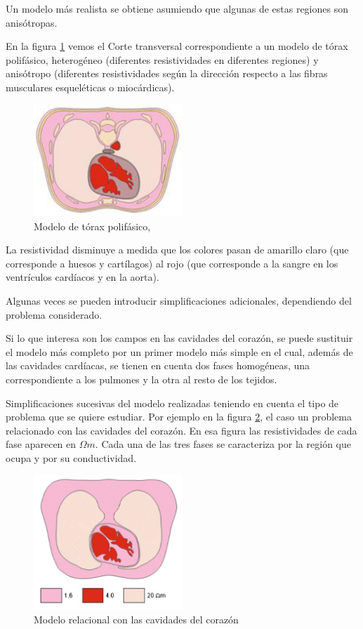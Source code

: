 Un modelo más realista se obtiene asumiendo que algunas de estas regiones son anisótropas.


En la figura \ref{fig:60} vemos el Corte transversal correspondiente a un modelo de tórax polifásico, heterogéneo (diferentes resistividades en diferentes regiones) y anisótropo (diferentes resistividades según la dirección respecto a las fibras musculares esqueléticas o miocárdicas).

\begin{figure}[H]
    \centering
    \includegraphics[width=0.5\textwidth]{./Figures/fig60}
	\caption{Modelo de tórax polifásico,}
	\label{fig:60}
\end{figure}

La resistividad disminuye a medida que los colores pasan de amarillo claro (que corresponde a huesos y cartílagos) al rojo (que corresponde a la sangre en los ventrículos cardíacos y en la aorta).

Algunas veces se pueden introducir simplificaciones adicionales, dependiendo del problema considerado.

Si lo que interesa son los campos en las cavidades del corazón, se puede sustituir el modelo más completo por un primer modelo más simple en el cual, además de las cavidades cardíacas, se tienen en cuenta dos fases homogéneas, una correspondiente a los pulmones y la otra al resto de los tejidos.

Simplificaciones sucesivas del modelo realizadas teniendo en cuenta el tipo de problema que se quiere estudiar. Por ejemplo en la figura \ref{fig:61}, el caso un problema relacionado con las cavidades del corazón. En esa figura las resistividades de cada fase aparecen en $\Omega m$. Cada una de las tres fases se caracteriza por la región que ocupa y por su conductividad.

\begin{figure}[H]
    \centering
    \includegraphics[width=0.5\textwidth]{./Figures/fig61}
	\caption{Modelo relacional con las cavidades del corazón}
	\label{fig:61}
\end{figure}

